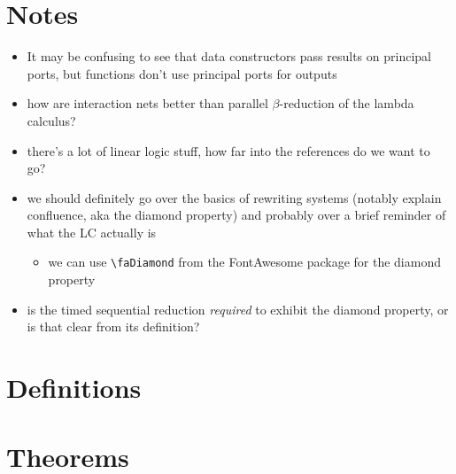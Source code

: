 \documentclass{fit-teorsem}
\begin{document}
\maketsheader
\thispagestyle{empty}

\section*{Notes}
\begin{itemize}
	\item It may be confusing to see that data constructors pass results on
		principal ports, but functions don't use principal ports for outputs
	\item how are interaction nets better than parallel $\beta$-reduction of
		the lambda calculus?
	\item there's a lot of linear logic stuff, how far into the references
		do we want to go?
	\item we should definitely go over the basics of rewriting systems
		(notably explain confluence, aka the diamond property) and
		probably over a brief reminder of what the LC actually is
		\begin{itemize}
			\item we can use \verb|\faDiamond| from the FontAwesome package
				for the diamond property
		\end{itemize}
	\item is the timed sequential reduction \textit{required} to exhibit
		the diamond property, or is that clear from its definition?
\end{itemize}

\section*{Definitions}

\section*{Theorems}
\end{document}
